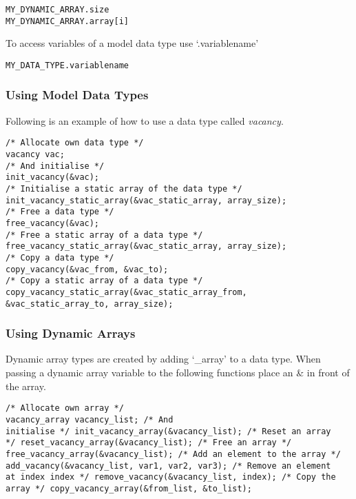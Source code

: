 \begin{mylisting}
\begin{verbatim}
MY_DYNAMIC_ARRAY.size
MY_DYNAMIC_ARRAY.array[i]
\end{verbatim}
\end{mylisting}

To access variables of a model data type use `.variablename'

\begin{mylisting}
\begin{verbatim}
MY_DATA_TYPE.variablename
\end{verbatim}
\end{mylisting}

\subsubsection{Using Model Data Types}

Following is an example of how to use a data type called
\emph{vacancy}.

\begin{mylisting}
\begin{verbatim}
/* Allocate own data type */
vacancy vac;
/* And initialise */
init_vacancy(&vac);
/* Initialise a static array of the data type */
init_vacancy_static_array(&vac_static_array, array_size);
/* Free a data type */
free_vacancy(&vac);
/* Free a static array of a data type */
free_vacancy_static_array(&vac_static_array, array_size);
/* Copy a data type */
copy_vacancy(&vac_from, &vac_to);
/* Copy a static array of a data type */
copy_vacancy_static_array(&vac_static_array_from, &vac_static_array_to, array_size);
\end{verbatim}
\end{mylisting}


\subsubsection{Using Dynamic Arrays}

Dynamic array types are created by adding `\_array' to a data type.
When passing a dynamic array variable to the following functions
place an \& in front of the array.

\begin{mylisting}
\begin{verbatim}
/* Allocate own array */
vacancy_array vacancy_list; /* And
initialise */ init_vacancy_array(&vacancy_list); /* Reset an array
*/ reset_vacancy_array(&vacancy_list); /* Free an array */
free_vacancy_array(&vacancy_list); /* Add an element to the array */
add_vacancy(&vacancy_list, var1, var2, var3); /* Remove an element
at index index */ remove_vacancy(&vacancy_list, index); /* Copy the
array */ copy_vacancy_array(&from_list, &to_list);
\end{verbatim}
\end{mylisting}

